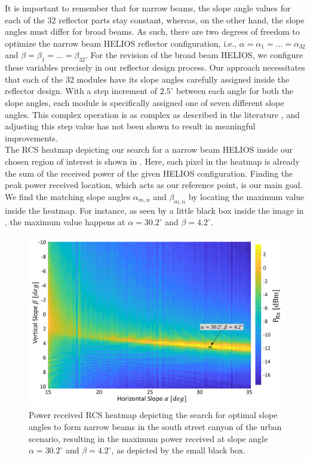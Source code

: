 It is important to remember that for narrow beams, the slope angle values for each of the \num{32} reflector parts stay constant, whereas, on the other hand, the slope angles must differ for broad beams. As such, there are two degrees of freedom to optimize the narrow beam HELIOS reflector configuration, i.e., $\alpha=\alpha_1 = \dots = \alpha_{32}$ and $\beta=\beta_1 = \dots = \beta_{32}$. For the revision of the broad beam HELIOS, we configure these variables precisely in our reflector design process. Our approach necessitates that each of the \num{32} modules have its slope angles carefully assigned inside the reflector design. With a step increment of $\num{2.5}^\circ$ between each angle for both the slope angles, each module is specifically assigned one of seven different slope angles. This complex operation is as complex as described in the literature \cite{Helios}, and adjusting this step value has not been shown to result in meaningful improvements.\\
The RCS heatmap depicting our search for a narrow beam HELIOS inside our chosen region of interest is shown in . Here, each pixel in the heatmap is already the sum of the received power of the given HELIOS configuration. Finding the peak power received location, which acts as our reference point, is our main goal. We find the matching slope angles $\alpha_{m,n}$ and $\beta_{m,n}$ by locating the maximum value inside the heatmap. For instance, as seen by a little black box inside the image in , the maximum value happens at $\alpha=\num{30.2}^\circ$ and $\beta=\num{4.2}^\circ$. 
\begin{figure}[H]
	\centering
	\includegraphics[width=0.78\linewidth]{images/Section 4 Images/urbanscenario_narrowsearch}
	\caption{Power received RCS heatmap depicting the search for optimal slope angles to form narrow beams in the south street canyon of the urban scenario, resulting in the maximum power received at slope angle $\alpha=\num{30.2}^\circ$ and $\beta=\num{4.2}^\circ$, as depicted by the small black box.}
	\label{fig:urbanscenario_narrowsearch}
\end{figure}
